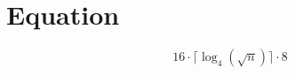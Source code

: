\documentclass{article}
\begin{document}
\section{Equation}

\[16 \cdot \lceil \log_4(\sqrt{n}) \rceil \cdot 8\]
\end{document}
